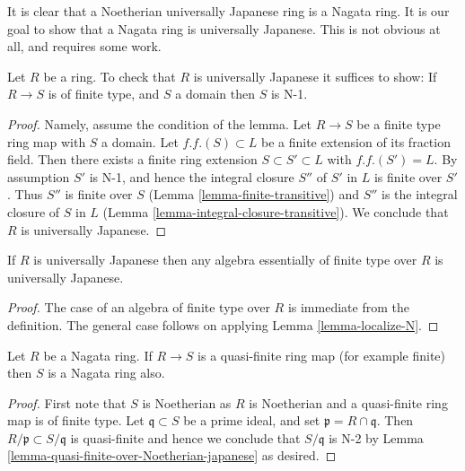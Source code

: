 \noindent
It is clear that a Noetherian universally Japanese ring is a Nagata ring.
It is our goal to show that a Nagata ring is universally Japanese. This is
not obvious at all, and requires some work.

\begin{lemma}
\label{lemma-check-universally-japanese}
Let $R$ be a ring.
To check that $R$ is universally Japanese it suffices to show:
If $R \to S$ is of finite type, and $S$ a domain then $S$ is N-1.
\end{lemma}

\begin{proof}
Namely, assume the condition of the lemma.
Let $R \to S$ be a finite type ring map with $S$ a domain.
Let $f.f.(S) \subset L$ be a finite extension of its fraction field.
Then there exists a finite ring extension $S \subset S' \subset L$
with $f.f.(S') = L$. By assumption $S'$ is N-1, and hence the integral
closure $S''$ of $S'$ in $L$ is finite over $S'$. Thus $S''$ is finite
over $S$ (Lemma \ref{lemma-finite-transitive})
and $S''$ is the integral closure of $S$ in $L$
(Lemma \ref{lemma-integral-closure-transitive}).
We conclude that $R$ is universally Japanese.
\end{proof}

\begin{lemma}
\label{lemma-universally-japanese}
If $R$ is universally Japanese then any algebra essentially of finite type
over $R$ is universally Japanese.
\end{lemma}

\begin{proof}
The case of an algebra of finite type over $R$ is immediate from
the definition. The general case follows on applying
Lemma \ref{lemma-localize-N}.
\end{proof}

\begin{lemma}
\label{lemma-quasi-finite-over-nagata}
Let $R$ be a Nagata ring.
If $R \to S$ is a quasi-finite ring map (for example finite)
then $S$ is a Nagata ring also.
\end{lemma}

\begin{proof}
First note that $S$ is Noetherian as $R$ is Noetherian and a quasi-finite
ring map is of finite type.
Let $\mathfrak q \subset S$ be a prime ideal, and set
$\mathfrak p = R \cap \mathfrak q$. Then
$R/\mathfrak p \subset S/\mathfrak q$ is quasi-finite and
hence we conclude that $S/\mathfrak q$ is N-2 by
Lemma \ref{lemma-quasi-finite-over-Noetherian-japanese}
as desired.
\end{proof}

